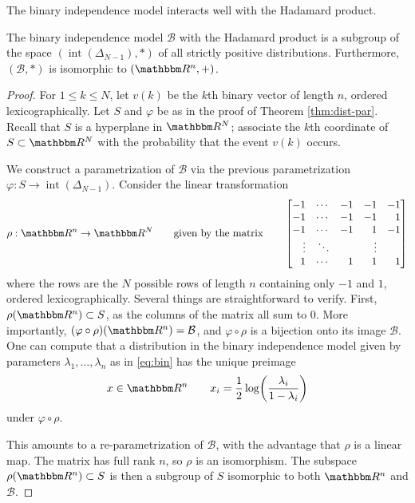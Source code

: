 \documentclass[11pt,titlepage]{article}
\newcommand*{\Bin}{\mathcal{B}}
\DeclareMathOperator{\intr}{int}
\numberwithin{equation}{section}
\begin{document}
    The binary independence model interacts well with the Hadamard product.
    \begin{theorem}\label{thm:bin-par}
    The binary independence model $\Bin$ with the Hadamard product is a subgroup
    of the space $(\intr(\Delta_{N-1}), *)$ of all strictly positive
    distributions.  Furthermore, $(\Bin, *)$ is  isomorphic to $(\R^n, +)$.
    \end{theorem}
    \begin{proof}
    For $1 \le k \le N$, let $v(k)$ be the $k$th binary vector of length $n$,
    ordered lexicographically.  Let $S$ and $\varphi$ be as in the proof of
    Theorem \ref{thm:dist-par}.  Recall that $S$ is a hyperplane in $\R^N$;
    associate the $k$th coordinate of $S \subset \R^N$ with the probability that
    the event $v(k)$ occurs.  
    
    We construct a parametrization of $\Bin$ via the previous parametrization
    $\varphi : S \to \intr(\Delta_{N-1})$. Consider the linear transformation 
    \[
        \rho: \R^n \to \R^N
        \qquad\text{given by the matrix}\qquad
        \begin{bmatrix*}[r]
            -1 & \cdots & -1 & -1 & -1 \\
            -1 & \cdots & -1 & -1 &  1 \\
            -1 & \cdots & -1 &  1 & -1 \\
            \vdots & \ddots &  & \vdots &  \\
             1 & \cdots &  1 &  1 &  1
        \end{bmatrix*}
    \]
    where the rows are the $N$ possible rows of length $n$ containing only $-1$
    and $1$, ordered lexicographically.  Several things are straightforward to
    verify.  First, $\rho(\R^n) \subset S$, as the columns of the matrix all sum
    to 0.  More importantly, $(\varphi \circ \rho)(\R^n) = \Bin$, and $\varphi
    \circ \rho$ is a bijection onto its image $\Bin$.  One can compute that a
    distribution in the binary independence model given by parameters
    $\lambda_1, \ldots, \lambda_n$ as in \eqref{eq:bin} has the unique preimage
    \[
        x \in \R^n
        \qquad
        x_i = \frac 1 2 \log \pdil*{\frac{\lambda_i}{1 - \lambda_i}}
    \]
    under $\varphi \circ \rho$.  
    
    This amounts to a re-parametrization of $\Bin$, with the advantage that
    $\rho$ is a linear map.  The matrix has full rank $n$, so $\rho$ is an
    isomorphism.  The subspace $\rho(\R^n) \subset S$ is then a subgroup of $S$
    isomorphic to both $\R^n$ and $\Bin$.
    \end{proof}
\end{document}
